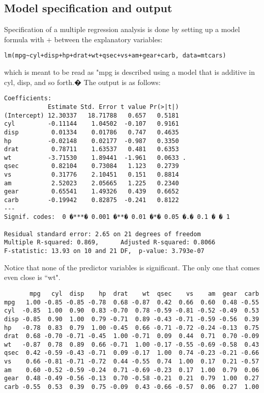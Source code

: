 \documentclass[12pt, a4paper]{report}
\theoremstyle{plain}
\theoremstyle{definition}
\theoremstyle{remark}
\begin{document}
\subsection{Model specification and output}
Specification of a multiple regression analysis is done by setting up a
model formula with + between the explanatory variables:
\begin{verbatim}
lm(mpg~cyl+disp+hp+drat+wt+qsec+vs+am+gear+carb, data=mtcars)
\end{verbatim}

which is meant to be read as "mpg is described using a model that
is additive in cyl, disp, and so forth.� The output is as follows:

\begin{verbatim}
Coefficients:
            Estimate Std. Error t value Pr(>|t|)
(Intercept) 12.30337   18.71788   0.657   0.5181
cyl         -0.11144    1.04502  -0.107   0.9161
disp         0.01334    0.01786   0.747   0.4635
hp          -0.02148    0.02177  -0.987   0.3350
drat         0.78711    1.63537   0.481   0.6353
wt          -3.71530    1.89441  -1.961   0.0633 .
qsec         0.82104    0.73084   1.123   0.2739
vs           0.31776    2.10451   0.151   0.8814
am           2.52023    2.05665   1.225   0.2340
gear         0.65541    1.49326   0.439   0.6652
carb        -0.19942    0.82875  -0.241   0.8122
---
Signif. codes:  0 �***� 0.001 �**� 0.01 �*� 0.05 �.� 0.1 � � 1

Residual standard error: 2.65 on 21 degrees of freedom
Multiple R-squared: 0.869,      Adjusted R-squared: 0.8066
F-statistic: 13.93 on 10 and 21 DF,  p-value: 3.793e-07
\end{verbatim}
Notice that none of the predictor variables is significant. The only one that comes even close is ``wt".

\small
\begin{verbatim}
       mpg   cyl  disp    hp  drat    wt  qsec    vs    am  gear  carb
mpg   1.00 -0.85 -0.85 -0.78  0.68 -0.87  0.42  0.66  0.60  0.48 -0.55
cyl  -0.85  1.00  0.90  0.83 -0.70  0.78 -0.59 -0.81 -0.52 -0.49  0.53
disp -0.85  0.90  1.00  0.79 -0.71  0.89 -0.43 -0.71 -0.59 -0.56  0.39
hp   -0.78  0.83  0.79  1.00 -0.45  0.66 -0.71 -0.72 -0.24 -0.13  0.75
drat  0.68 -0.70 -0.71 -0.45  1.00 -0.71  0.09  0.44  0.71  0.70 -0.09
wt   -0.87  0.78  0.89  0.66 -0.71  1.00 -0.17 -0.55 -0.69 -0.58  0.43
qsec  0.42 -0.59 -0.43 -0.71  0.09 -0.17  1.00  0.74 -0.23 -0.21 -0.66
vs    0.66 -0.81 -0.71 -0.72  0.44 -0.55  0.74  1.00  0.17  0.21 -0.57
am    0.60 -0.52 -0.59 -0.24  0.71 -0.69 -0.23  0.17  1.00  0.79  0.06
gear  0.48 -0.49 -0.56 -0.13  0.70 -0.58 -0.21  0.21  0.79  1.00  0.27
carb -0.55  0.53  0.39  0.75 -0.09  0.43 -0.66 -0.57  0.06  0.27  1.00
\end{verbatim}
\normalsize
\end{document}
